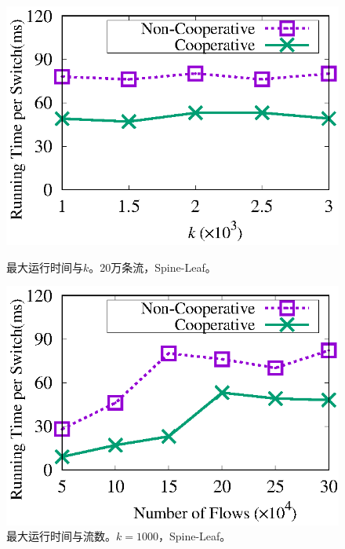 \begin{figure}[!t]
	\centering
	\begin{minipage}[t]{0.48\linewidth}		
		\centering
		\includegraphics[width=\linewidth]{fig/half_eg_time_k.eps}
		\caption{\textnormal{最大运行时间与$k$。20万条流，Spine-Leaf。}}
		\label{fig:coop,time,k}
	\end{minipage}\vspace{-0.6em}\hspace{0.4em}
	\begin{minipage}[t]{0.48\linewidth}
		\centering
		\includegraphics[width=\linewidth]{fig/half_eg_time_flow.eps}
		\caption{\textnormal{最大运行时间与流数。$k=1000$，Spine-Leaf。}}
		\label{fig:coop,time,flow}
	\end{minipage}\vspace{-0.6em}
\end{figure}

